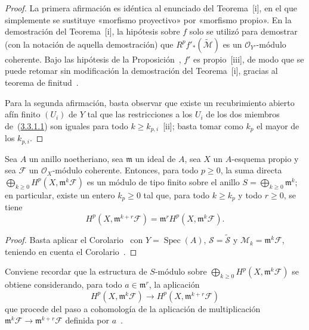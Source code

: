 \begin{proof}
La primera afirmación es idéntica al enunciado del Teorema~[i], en el que simplemente se sustituye «morfismo proyectivo» por «morfismo propio».
En la demostración del Teorema~[i], la hipótesis sobre $f$ solo se utilizó para demostrar (con la notación de aquella demostración) que $R^pf'_*(\widetilde{\mathcal M})$ es un $\mathcal O_{Y'}$-módulo coherente.
Bajo las hipótesis de la Proposición~, $f'$ es propio~[iii], de modo que se puede retomar sin modificación la demostración del Teorema~[i], gracias al teorema de finitud~.

Para la segunda afirmación, basta observar que existe un recubrimiento abierto afín finito $(U_i)$ de $Y$ tal que las restricciones a los $U_i$ de los dos miembros de~(\hyperref[III.3.3.1.1]{3.3.1.1}) son iguales para todo $k\geq k_{p,i}$~[ii]; basta tomar como $k_p$ el mayor de los $k_{p,i}$.
\end{proof}

\begin{corollary}[3.3.2]
\label{III.3.3.2}
\label{III.3.3.2-fr}
Sea $A$ un anillo noetheriano, sea $\mathfrak m$ un ideal de $A$, sea $X$ un $A$-esquema propio y sea $\mathcal F$ un $\mathcal O_X$-módulo coherente.
Entonces, para todo $p\geq0$, la suma directa $\bigoplus_{k\geq0}H^p(X,\mathfrak m^k\mathcal F)$ es un módulo de tipo finito sobre el anillo $S=\bigoplus_{k\geq0}\mathfrak m^k$; en particular, existe un entero $k_p\geq0$ tal que, para todo $k\geq k_p$ y todo $r\geq0$, se tiene
\[
H^p(X,\mathfrak m^{k+r}\mathcal F)
=\mathfrak m^rH^p(X,\mathfrak m^k\mathcal F).
\tag{3.3.3.1}\label{III.3.3.2.1-fr}
\]
\end{corollary}

\begin{proof}
Basta aplicar el Corolario~ con $Y=\operatorname{Spec}(A)$, $\mathcal S=\widetilde{\mathcal S}$ y $\mathcal M_k=\mathfrak m^k\mathcal F$, teniendo en cuenta el Corolario~.
\end{proof}

Conviene recordar que la estructura de $S$-módulo sobre $\bigoplus_{k\geq0}H^p(X,\mathfrak m^k\mathcal F)$ se obtiene considerando, para todo $a\in\mathfrak m^r$, la aplicación \[
H^p(X,\mathfrak m^k\mathcal F)
\longrightarrow H^p(X,\mathfrak m^{k+r}\mathcal F)
\] que procede del paso a cohomología de la aplicación de multiplicación $\mathfrak m^k\mathcal F\to\mathfrak m^{k+r}\mathcal F$ definida por $a$~.

